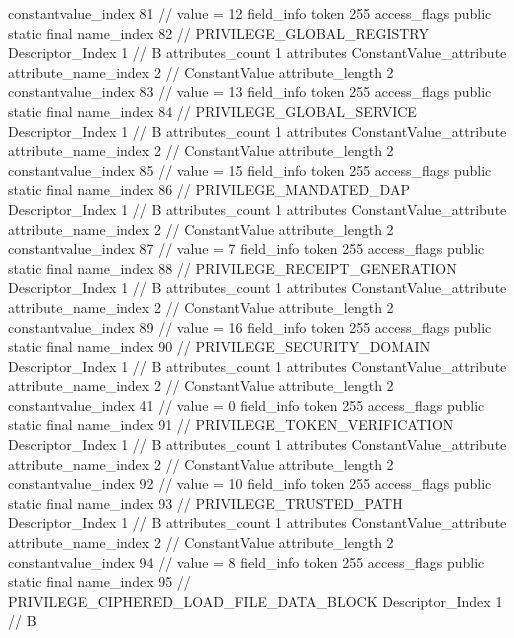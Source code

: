 {{{{{{{					constantvalue_index	81		// value = 12
				}
				}
			}
			field_info {
				token	255
				access_flags	public static final
				name_index	82		// PRIVILEGE_GLOBAL_REGISTRY
				Descriptor_Index	1		// B
				attributes_count	1
				attributes {
				ConstantValue_attribute {
					attribute_name_index	2		// ConstantValue
					attribute_length	2
					constantvalue_index	83		// value = 13
				}
				}
			}
			field_info {
				token	255
				access_flags	public static final
				name_index	84		// PRIVILEGE_GLOBAL_SERVICE
				Descriptor_Index	1		// B
				attributes_count	1
				attributes {
				ConstantValue_attribute {
					attribute_name_index	2		// ConstantValue
					attribute_length	2
					constantvalue_index	85		// value = 15
				}
				}
			}
			field_info {
				token	255
				access_flags	public static final
				name_index	86		// PRIVILEGE_MANDATED_DAP
				Descriptor_Index	1		// B
				attributes_count	1
				attributes {
				ConstantValue_attribute {
					attribute_name_index	2		// ConstantValue
					attribute_length	2
					constantvalue_index	87		// value = 7
				}
				}
			}
			field_info {
				token	255
				access_flags	public static final
				name_index	88		// PRIVILEGE_RECEIPT_GENERATION
				Descriptor_Index	1		// B
				attributes_count	1
				attributes {
				ConstantValue_attribute {
					attribute_name_index	2		// ConstantValue
					attribute_length	2
					constantvalue_index	89		// value = 16
				}
				}
			}
			field_info {
				token	255
				access_flags	public static final
				name_index	90		// PRIVILEGE_SECURITY_DOMAIN
				Descriptor_Index	1		// B
				attributes_count	1
				attributes {
				ConstantValue_attribute {
					attribute_name_index	2		// ConstantValue
					attribute_length	2
					constantvalue_index	41		// value = 0
				}
				}
			}
			field_info {
				token	255
				access_flags	public static final
				name_index	91		// PRIVILEGE_TOKEN_VERIFICATION
				Descriptor_Index	1		// B
				attributes_count	1
				attributes {
				ConstantValue_attribute {
					attribute_name_index	2		// ConstantValue
					attribute_length	2
					constantvalue_index	92		// value = 10
				}
				}
			}
			field_info {
				token	255
				access_flags	public static final
				name_index	93		// PRIVILEGE_TRUSTED_PATH
				Descriptor_Index	1		// B
				attributes_count	1
				attributes {
				ConstantValue_attribute {
					attribute_name_index	2		// ConstantValue
					attribute_length	2
					constantvalue_index	94		// value = 8
				}
				}
			}
			field_info {
				token	255
				access_flags	public static final
				name_index	95		// PRIVILEGE_CIPHERED_LOAD_FILE_DATA_BLOCK
				Descriptor_Index	1		// B
}}}}}
